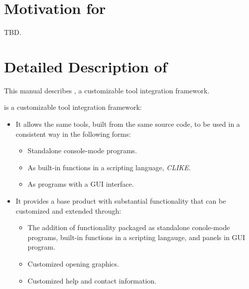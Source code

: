 \section{Motivation for \emph{\productname{}}}
\label{cint2:smfp0}

TBD.


\section{Detailed Description of \emph{\productname{}}}
\label{cint2:sddp0}

This manual describes \emph{\productname{}}, a customizable tool integration
framework.

\emph{\productname{}} is a customizable tool integration framework:
\begin{itemize}
      \item It allows the same tools, built from the same source code,
            to be used in a consistent way in the following forms:
            \begin{itemize}
                  \item Standalone console-mode programs.
                  \item As built-in functions in a scripting language, \emph{CLIKE}.
                  \item As programs with a GUI interface.
            \end{itemize}
      \item It provides a base product with substantial functionality that can be
            customized and extended through:
            \begin{itemize}
                \item The addition of functionality packaged as standalone conole-mode programs,
                      built-in functions in a scripting langauge, and panels in GUI
                      program.
                \item Customized opening graphics.
                \item Customized help and contact information.
          \end{itemize}
\end{itemize}

%
%
%
%
%
%
%




